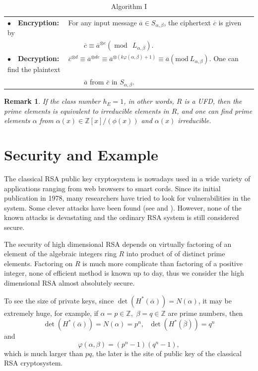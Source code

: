 \documentclass [11pt]{article}
\newtheorem{rem}[thm]{\bf Remark}
\begin{document}
\begin{table}[h]
\begin{tabular}{l}
 \noindent$\bullet$\ \ {\bf{Encryption:}} \ \  For any input message $\overline{a} \in S_{\alpha , \beta}$, the ciphertext
$\overline{c} $  is given  by\\ \ \ \ \ \ \ \ \ \ \ \ \ \ \ \ \ \ \ \ \ \ \
$
\overline{c} \equiv \overline{a} ^{ \otimes e} (\operatorname{mod}\ \  L_{\alpha, \beta}).
$\\
 \noindent$\bullet$\ \ {\bf{Decryption:}} \ \
 $\overline{c}^{\otimes d} \equiv \overline{a}^{\otimes  d e} \equiv \overline{a}^{\otimes( k\varphi(\alpha, \beta)+1)} \equiv \overline{a}(\text{mod}\  L_{\alpha, \beta}).$ One can find the plaintext \\
 \ \ \ \ \ \ \ \ \ \ \ \ \ \ \ \ \ \ \ \ \ \ $ \overline{a}$ from $\overline{c}$ in $S_{\alpha, \beta}$.\\
\hline
\end{tabular}
\caption{ Algorithm I}
\end{table}


\newpage
\begin{rem}
If the class number $h_{E}=1$, in other words, $R$ is a UFD, then the prime elements is equivalent to irreducible elements in $R$,
and one can find prime elements  $\alpha$ from $\alpha(x) \in \mathbb{Z}[x]/(\phi(x))$ and $\alpha(x)$  irreducible.

\end{rem}


\section{ Security and Example}
The classical RSA public key cryptosystem is nowadays   used in a wide variety of applications ranging from web browsers to smart cords. Since its initial publication in 1978, many researchers have tried to look for vulnerabilities in the system. Some clever attacks have been found (see \cite{B} and \cite{C} ). However, none of the  known attacks is devastating and the ordinary RSA system is still considered secure.

The security of high dimensional RSA depends on virtually factoring of an element of the algebraic integers ring $R$ into product of of
distinct  prime elements. Factoring on $R$ is much more complicate  than factoring of a positive integer, none of efficient  method is known
  up to day, thus we consider the high dimensional RSA  almost absolutely  secure.

To see the size of private keys, since $\operatorname{det}\left(H^{*}(\overline{\alpha})\right)=N(\alpha)$, it may be extremely huge, for example, if $\alpha=p \in \mathbb{Z},$ $ \beta=q \in \mathbb{Z}$ are prime numbers, then
$$
\operatorname{det}\left(H^{*}(\overline{\alpha})\right)=N(\alpha)=p^{n},\ \ \  \operatorname{det}\left(H^{*}(\overline{\beta})\right)=q^{n}
$$
and
$$\varphi(\alpha, \beta)=\left(p^{n}-1\right)\left(q^{n}-1\right),$$
which is much larger than $p q$, the later is the site of public key  of the classical  RSA cryptosystem.
\end{document}
